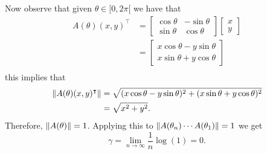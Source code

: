\begin{example}
Now observe that given $\theta \in [0, 2\pi[$ we have that
\begin{align*}
A(\theta) (x,y)^\intercal& = 
\begin{bmatrix}
	\cos \theta & - \sin \theta \\
	\sin \theta & \cos \theta
\end{bmatrix}
\begin{bmatrix}
	x \\ 
	y
\end{bmatrix} \\
& =  
\begin{bmatrix}
	x \cos \theta  - y \sin \theta \\
	x \sin \theta + y \cos \theta
\end{bmatrix} \\
\end{align*}
this implies that 
\begin{align*}
\norm{A(\theta) (x,y)^\intercal} & = \sqrt{(x \cos \theta - y \sin \theta)^2  + (x \sin \theta + y \cos \theta )^2}  \\
 & = \sqrt{ x^2 + y^2 }.
\end{align*}
Therefore, $\norm{A(\theta) } = 1$. Applying this to $\norm{A(\theta_n) \cdots A(\theta_1)} = 1$ we get
\[
\gamma  = \lim_{n \to \infty} \frac{1}{n} \log(1) = 0.
\]
\end{example}


